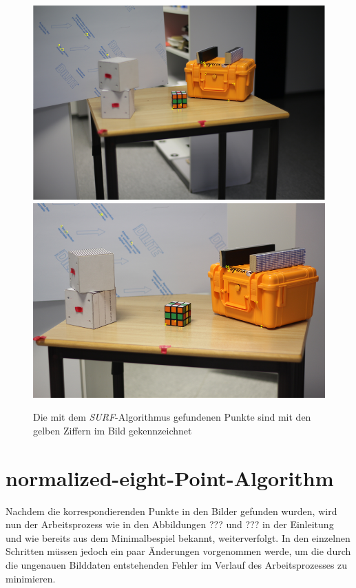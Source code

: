 \begin{figure}[!htb]
	\includegraphics[width=\linewidth]{images/PointsDetectedLeft.png}
	\label{fig:awesome_image1}
	\endminipage\hfill
	\includegraphics[width=\linewidth]{images/PointsDetectedRight.png}
	\label{fig:awesome_image2}
	\endminipage\hfill
	\caption{Die mit dem \textit{SURF}-Algorithmus gefundenen Punkte sind mit den gelben Ziffern im Bild gekennzeichnet}
\end{figure}


\section{normalized-eight-Point-Algorithm}

Nachdem die korrespondierenden Punkte in den Bilder gefunden wurden, wird nun der Arbeitsprozess wie in den Abbildungen ??? und ??? in der Einleitung und wie bereits aus dem Minimalbespiel bekannt, weiterverfolgt. In den einzelnen Schritten müssen jedoch ein paar Änderungen vorgenommen werde, um die durch die ungenauen Bilddaten entstehenden Fehler im Verlauf des Arbeitsprozesses zu minimieren. 

